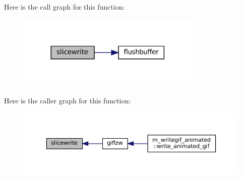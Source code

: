 Here is the call graph for this function\+:
\nopagebreak
\begin{figure}[H]
\begin{center}
\leavevmode
\includegraphics[width=248pt]{M__writegif__animated_8f90_ac5c0245eea61f109cbf3ce5bbf38981b_cgraph}
\end{center}
\end{figure}
Here is the caller graph for this function\+:
\nopagebreak
\begin{figure}[H]
\begin{center}
\leavevmode
\includegraphics[width=350pt]{M__writegif__animated_8f90_ac5c0245eea61f109cbf3ce5bbf38981b_icgraph}
\end{center}
\end{figure}
